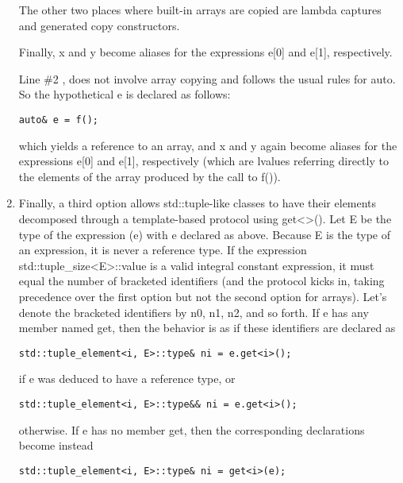 \begin{enumerate}
\begin{tcolorbox}[colback=webgreen!5!white,colframe=webgreen!75!black]
\hspace*{0.75cm}The other two places where built-in arrays are copied are lambda captures and generated copy constructors.
\end{tcolorbox}

Finally, x and y become aliases for the expressions e[0] and e[1], respectively.

Line \#2 , does not involve array copying and follows the usual rules for auto. So the hypothetical e is declared as follows:

\begin{lstlisting}[style=styleCXX]
auto& e = f();
\end{lstlisting}

which yields a reference to an array, and x and y again become aliases for the expressions e[0] and e[1], respectively (which are lvalues referring directly to the elements of the array produced by the call to f()).

\item
Finally, a third option allows std::tuple-like classes to have their elements decomposed through a template-based protocol using get<>(). Let E be the type of the expression (e) with e declared as above. Because E is the type of an expression, it is never a reference type. If the expression std::tuple\_size<E>::value is a valid integral constant expression, it must equal the number of bracketed identifiers (and the protocol kicks in, taking precedence over the first option but not the second option for arrays). Let’s denote the bracketed identifiers by n0, n1, n2, and so forth. If e has any member named get, then the behavior is as if these identifiers are declared as

\begin{lstlisting}[style=styleCXX]
std::tuple_element<i, E>::type& ni = e.get<i>();
\end{lstlisting}

if e was deduced to have a reference type, or

\begin{lstlisting}[style=styleCXX]
std::tuple_element<i, E>::type&& ni = e.get<i>();
\end{lstlisting}

otherwise. If e has no member get, then the corresponding declarations become instead

\begin{lstlisting}[style=styleCXX]
std::tuple_element<i, E>::type& ni = get<i>(e);
\end{lstlisting}


\end{enumerate}
